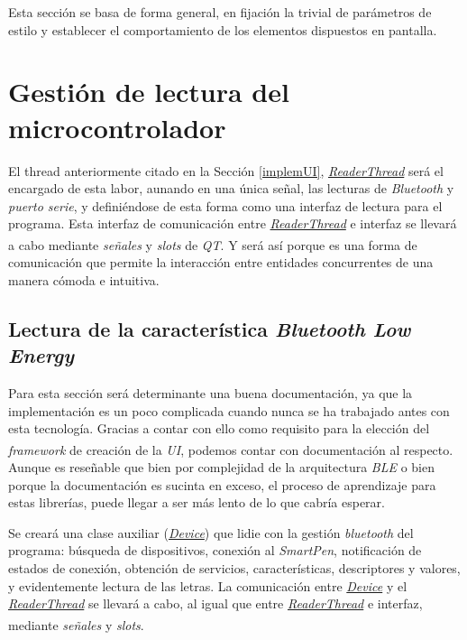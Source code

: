 Esta sección se basa de forma general, en fijación la trivial de parámetros
de estilo y establecer el comportamiento de los elementos dispuestos en pantalla.

\section{Gestión de lectura del microcontrolador}
El thread anteriormente citado en la Sección \ref{implemUI},
\href{https://github.com/AntonioPriego/SmartPen/blob/main/SmartPenUI/readerthread.cpp}{\textit{ReaderThread}}
será el encargado de esta labor, aunando en una única señal, las lecturas
de \textit{Bluetooth} y \textit{puerto serie}, y definiéndose de esta forma
como una interfaz de lectura para el programa. Esta interfaz de comunicación
entre 
\href{https://github.com/AntonioPriego/SmartPen/blob/main/SmartPenUI/readerthread.cpp}{\textit{ReaderThread}}
e interfaz se llevará a cabo mediante \textit{señales} y
\textit{slots}\textsuperscript{\cite{signalsQT}}
de \textit{QT}. Y será así porque es una forma de comunicación que permite
la interacción entre entidades concurrentes de una manera cómoda e intuitiva.


\subsection{Lectura de la característica \textit{Bluetooth Low Energy}}
Para esta sección será determinante una buena documentación, ya que la
implementación es un poco complicada cuando nunca se ha trabajado antes
con esta tecnología. Gracias a contar con ello como requisito para
la elección del \textit{framework} de creación de la \textit{UI},
podemos contar con documentación al respecto\textsuperscript{\cite{ejBLE}}.
Aunque es reseñable que bien por complejidad de la arquitectura \textit{BLE}
o bien porque la documentación es sucinta en exceso, el proceso de aprendizaje
para estas librerías, puede llegar a ser más lento de lo que cabría esperar.

Se creará una clase auxiliar
(\href{https://github.com/AntonioPriego/SmartPen/blob/main/SmartPenUI/device.cpp}{\textit{Device}})
que lidie con la gestión \textit{bluetooth} del programa: búsqueda de
dispositivos, conexión al \textit{SmartPen}, notificación de estados de conexión,
obtención de servicios, características, descriptores y valores,
y evidentemente lectura de las letras. La comunicación entre 
\href{https://github.com/AntonioPriego/SmartPen/blob/main/SmartPenUI/device.cpp}{\textit{Device}}
y el
\href{https://github.com/AntonioPriego/SmartPen/blob/main/SmartPenUI/readerthread.cpp}{\textit{ReaderThread}}
se llevará a cabo, al igual que entre
\href{https://github.com/AntonioPriego/SmartPen/blob/main/SmartPenUI/readerthread.cpp}{\textit{ReaderThread}}
e interfaz, mediante \textit{señales} y \textit{slots}\textsuperscript{\cite{signalsQT}}.

